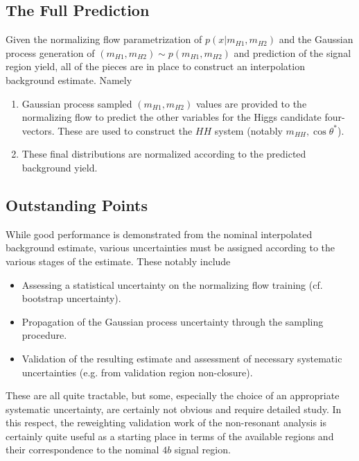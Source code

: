 \subsection{The Full Prediction}
Given the normalizing flow parametrization of $p(x | m_{H1}, m_{H2})$ and the Gaussian process generation of 
$(m_{H1}, m_{H2}) \sim p(m_{H1}, m_{H2})$ and prediction of the signal region yield, all of the pieces are 
in place to construct an interpolation background estimate. Namely
\begin{enumerate}
	\item Gaussian process sampled $(m_{H1}, m_{H2})$ values are provided to the normalizing flow to predict 
	the other variables for the Higgs candidate four-vectors. These are used to construct the $HH$ system (notably 
	$m_{HH}, \cos{\theta^{*}}$).
	\item These final distributions are normalized according to the predicted background yield.
\end{enumerate}

\subsection{Outstanding Points}
While good performance is demonstrated from the nominal interpolated background estimate, various 
uncertainties must be assigned according to the various stages of the estimate. These notably include
\begin{itemize}
	\item Assessing a statistical uncertainty on the normalizing flow training (cf. bootstrap uncertainty).
	\item Propagation of the Gaussian process uncertainty through the sampling procedure.
	\item Validation of the resulting estimate and assessment of necessary systematic uncertainties (e.g. from 
	validation region non-closure).
\end{itemize}
These are all quite tractable, but some, especially the choice of an appropriate systematic uncertainty, 
are certainly not obvious and require detailed study. In this respect, the reweighting validation work of the 
non-resonant analysis is certainly quite useful as a starting place in terms of the available regions 
and their correspondence to the nominal $4b$ signal region.


